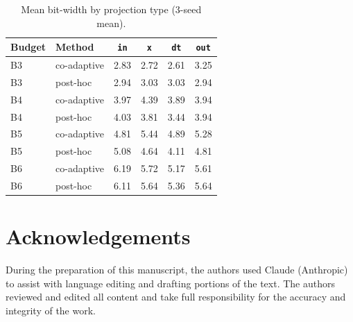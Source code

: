 \documentclass[conference]{IEEEtran}
\begin{document}
\begin{table}[h]
\caption{Mean bit-width by projection type (3-seed mean).}
\label{tab:projbits}
\begin{center}
\begin{tabular}{llcccc}
\toprule
\textbf{Budget} & \textbf{Method} & \texttt{in} & \texttt{x} & \texttt{dt} & \texttt{out} \\
\midrule
B3 & co-adaptive   & 2.83 & 2.72 & 2.61 & 3.25 \\
B3 & post-hoc & 2.94 & 3.03 & 3.03 & 2.94 \\
\midrule
B4 & co-adaptive   & 3.97 & 4.39 & 3.89 & 3.94 \\
B4 & post-hoc & 4.03 & 3.81 & 3.44 & 3.94 \\
\midrule
B5 & co-adaptive   & 4.81 & 5.44 & 4.89 & 5.28 \\
B5 & post-hoc & 5.08 & 4.64 & 4.11 & 4.81 \\
\midrule
B6 & co-adaptive   & 6.19 & 5.72 & 5.17 & 5.61 \\
B6 & post-hoc & 6.11 & 5.64 & 5.36 & 5.64 \\
\bottomrule
\end{tabular}
\end{center}
\end{table}

\section*{Acknowledgements}
During the preparation of this manuscript, the authors used Claude (Anthropic)
\cite{claude} to assist with language editing and drafting portions of the text.
The authors reviewed and edited all content and take full responsibility for the
accuracy and integrity of the work.



\end{document}
